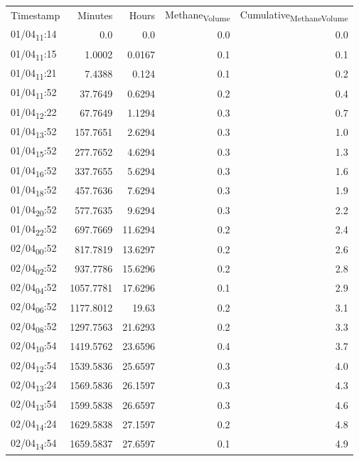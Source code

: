 \documentclass[11pt]{article}
\begin{document}
\begin{center}
\begin{tabular}{lrrrr}
Timestamp & Minutes & Hours & Methane\textsubscript{Volume} & Cumulative\textsubscript{Methane}\textsubscript{Volume}\\[0pt]
01/04\textsubscript{11}:14 & 0.0 & 0.0 & 0.0 & 0.0\\[0pt]
01/04\textsubscript{11}:15 & 1.0002 & 0.0167 & 0.1 & 0.1\\[0pt]
01/04\textsubscript{11}:21 & 7.4388 & 0.124 & 0.1 & 0.2\\[0pt]
01/04\textsubscript{11}:52 & 37.7649 & 0.6294 & 0.2 & 0.4\\[0pt]
01/04\textsubscript{12}:22 & 67.7649 & 1.1294 & 0.3 & 0.7\\[0pt]
01/04\textsubscript{13}:52 & 157.7651 & 2.6294 & 0.3 & 1.0\\[0pt]
01/04\textsubscript{15}:52 & 277.7652 & 4.6294 & 0.3 & 1.3\\[0pt]
01/04\textsubscript{16}:52 & 337.7655 & 5.6294 & 0.3 & 1.6\\[0pt]
01/04\textsubscript{18}:52 & 457.7636 & 7.6294 & 0.3 & 1.9\\[0pt]
01/04\textsubscript{20}:52 & 577.7635 & 9.6294 & 0.3 & 2.2\\[0pt]
01/04\textsubscript{22}:52 & 697.7669 & 11.6294 & 0.2 & 2.4\\[0pt]
02/04\textsubscript{00}:52 & 817.7819 & 13.6297 & 0.2 & 2.6\\[0pt]
02/04\textsubscript{02}:52 & 937.7786 & 15.6296 & 0.2 & 2.8\\[0pt]
02/04\textsubscript{04}:52 & 1057.7781 & 17.6296 & 0.1 & 2.9\\[0pt]
02/04\textsubscript{06}:52 & 1177.8012 & 19.63 & 0.2 & 3.1\\[0pt]
02/04\textsubscript{08}:52 & 1297.7563 & 21.6293 & 0.2 & 3.3\\[0pt]
02/04\textsubscript{10}:54 & 1419.5762 & 23.6596 & 0.4 & 3.7\\[0pt]
02/04\textsubscript{12}:54 & 1539.5836 & 25.6597 & 0.3 & 4.0\\[0pt]
02/04\textsubscript{13}:24 & 1569.5836 & 26.1597 & 0.3 & 4.3\\[0pt]
02/04\textsubscript{13}:54 & 1599.5838 & 26.6597 & 0.3 & 4.6\\[0pt]
02/04\textsubscript{14}:24 & 1629.5838 & 27.1597 & 0.2 & 4.8\\[0pt]
02/04\textsubscript{14}:54 & 1659.5837 & 27.6597 & 0.1 & 4.9\\[0pt]

\end{tabular}
\end{center}
\end{document}
